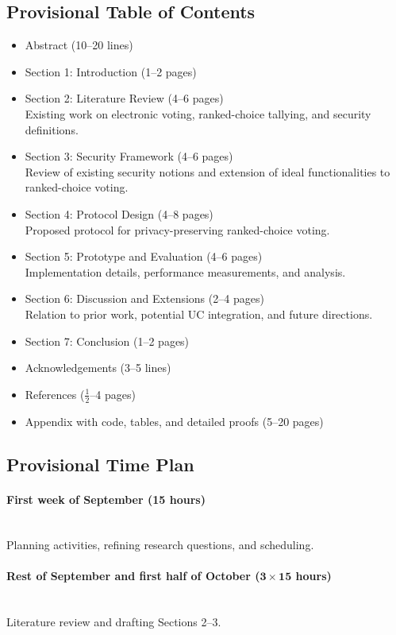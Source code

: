 \documentclass{article}
\newcommand{\timeest}[1]{$\mathbf{#1}$}%
\begin{document}
\subsection*{Provisional Table of Contents}
\begin{itemize}
    \item Abstract (10--20 lines)
    \item Section 1: Introduction (1--2 pages)
    \item Section 2: Literature Review (4--6 pages) \\
    Existing work on electronic voting, ranked-choice tallying, and security definitions.
    \item Section 3: Security Framework (4--6 pages) \\
    Review of existing security notions and extension of ideal functionalities to ranked-choice voting.
    \item Section 4: Protocol Design (4--8 pages) \\
    Proposed protocol for privacy-preserving ranked-choice voting.
    \item Section 5: Prototype and Evaluation (4--6 pages) \\
    Implementation details, performance measurements, and analysis.
    \item Section 6: Discussion and Extensions (2--4 pages) \\
    Relation to prior work, potential UC integration, and future directions.
    \item Section 7: Conclusion (1--2 pages)
    \item Acknowledgements (3--5 lines)
    \item References ($\frac{1}{2}$--4 pages)
    \item Appendix with code, tables, and detailed proofs (5--20 pages)
\end{itemize}

\newpage
\subsection*{Provisional Time Plan}

\paragraph{First week of September (15 hours)}~\\\noindent
Planning activities, refining research questions, and scheduling.

\paragraph{Rest of September and first half of October (\timeest{3\times 15} hours)}~\\\noindent
Literature review and drafting Sections 2--3.
\end{document}
